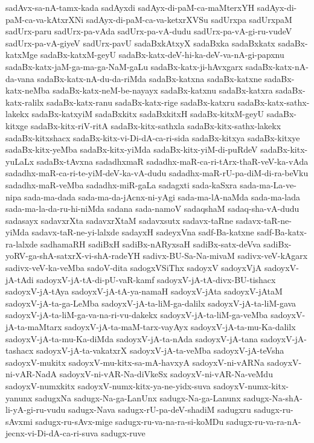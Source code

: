 {sadAvx-sa-nA-tamx-kada
sadAyxdi
sadAyx-di-paM-ca-maMterxYH
sadAyx-di-paM-ca-va-kAtxrXNi
sadAyx-di-paM-ca-va-ketxrXVSu
sadUrxpa
sadUrxpaM
sadUrx-paru
sadUrx-pa-vAda
sadUrx-pa-vA-dudu
sadUrx-pa-vA-gi-ru-vudeV
sadUrx-pa-vA-giyeV
sadUrx-pavU
sadaBxkAtxyX
sadaBxka
sadaBxkatx
sadaBx-katxMge
sadaBx-katxM-geyU
sadaBx-katx-deV-hi-ka-deV-va-nA-gi-papxnu
sadaBx-katx-jaM-ga-ma-ga-NaM-gaLu
sadaBx-katx-ji-hAvxgarx
sadaBx-katx-nA-da-vana
sadaBx-katx-nA-du-da-riMda
sadaBx-katxna
sadaBx-katxne
sadaBx-katx-neMba
sadaBx-katx-neM-be-nayayx
sadaBx-katxnu
sadaBx-katxra
sadaBx-katx-ralilx
sadaBx-katx-ranu
sadaBx-katx-rige
sadaBx-katxru
sadaBx-katx-sathx-lakekx
sadaBx-katxyiM
sadaBxkitx
sadaBxkitxH
sadaBx-kitxM-geyU
sadaBx-kitxge
sadaBx-kitx-riV-ritA
sadaBx-kitx-sathxla
sadaBx-kitx-sathx-lakekx
sadaBx-kitxshacx
sadaBx-kitx-vi-Di-dA-ca-ri-sida
sadaBx-kitxya
sadaBx-kitxye
sadaBx-kitx-yeMba
sadaBx-kitx-yiMda
sadaBx-kitx-yiM-di-puRdeV
sadaBx-kitx-yuLaLx
sadaBx-tAvxna
sadadhxmaR
sadadhx-maR-ca-ri-tArx-thaR-veV-ka-vAda
sadadhx-maR-ca-ri-te-yiM-deV-ka-vA-dudu
sadadhx-maR-rU-pa-diM-di-ra-beVku
sadadhx-maR-veMba
sadadhx-miR-gaLa
sadagxti
sada-kaSxra
sada-ma-La-ve-nipa
sada-ma-dada
sada-ma-da-jAcnx-ni-yAgi
sada-ma-lA-naMda
sada-ma-lada
sada-ma-la-da-ru-hi-niMda
sadana
sada-namoV
sadaqshaM
sadaq-sha-vA-dudu
sadasayx
sadavxrXta
sadavxrXtaM
sadavxsutx
sadavx-taRne
sadavx-taR-ne-yiMda
sadavx-taR-ne-yi-lalxde
sadayxH
sadeyxVna
sadf-Ba-katxne
sadf-Ba-katx-ra-lalxde
sadhamaRH
sadiBxH
sadiBx-nARyxsaH
sadiBx-satx-deVva
sadiBx-yoRV-ga-shA-satxrX-vi-shA-radeYH
sadivx-BU-Sa-Na-mivaM
sadivx-veV-kAgarx
sadivx-veV-ka-veMba
sadoV-dita
sadogxVSiThx
sadoyxV
sadoyxVjA
sadoyxV-jA-tAdi
sadoyxV-jA-tA-di-pU-vaR-kamf
sadoyxV-jA-tA-divx-BU-tishacx
sadoyxV-jA-tAya
sadoyxV-jA-tA-ya-namaH
sadoyxV-jAta
sadoyxV-jAtaM
sadoyxV-jA-ta-ga-LeMba
sadoyxV-jA-ta-liM-ga-dalilx
sadoyxV-jA-ta-liM-gava
sadoyxV-jA-ta-liM-ga-va-na-ri-vu-dakekx
sadoyxV-jA-ta-liM-ga-veMba
sadoyxV-jA-ta-maMtarx
sadoyxV-jA-ta-maM-tarx-vayAyx
sadoyxV-jA-ta-mu-Ka-dalilx
sadoyxV-jA-ta-mu-Ka-diMda
sadoyxV-jA-ta-nAda
sadoyxV-jA-tana
sadoyxV-jA-tashacx
sadoyxV-jA-ta-vakatxrX
sadoyxV-jA-ta-veMba
sadoyxV-jA-teVsha
sadoyxV-mukitx
sadoyxV-mu-kitx-sa-mA-havxyA
sadoyxV-ni-vARNa
sadoyxV-ni-vAR-NadA
sadoyxV-ni-vAR-Na-diVkeSx
sadoyxV-ni-vAR-Na-veMdu
sadoyxV-numxkitx
sadoyxV-numx-kitx-ya-ne-yidx-suva
sadoyxV-numx-kitx-yanunx
sadugxNa
sadugx-Na-ga-LanUnx
sadugx-Na-ga-Lanunx
sadugx-Na-shA-li-yA-gi-ru-vudu
sadugx-Nava
sadugx-rU-pa-deV-shadiM
sadugxru
sadugx-ru-sAvxmi
sadugx-ru-sAvx-mige
sadugx-ru-va-na-ra-si-koMDu
sadugx-ru-va-ra-nA-jecnx-vi-Di-dA-ca-ri-suva
sadugx-ruve
}
